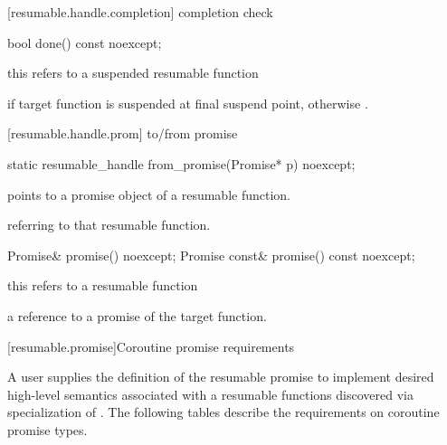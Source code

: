 [resumable.handle.completion]{ completion check}
\begin{itemdecl}
  bool done() const noexcept; 
\end{itemdecl}
\begin{itemdescr}
  \pnum
  \precondition *this refers to a suspended resumable function
  
  \pnum
  \returns {} if target function is suspended
  at final suspend point, otherwise .
\end{itemdescr}

[resumable.handle.prom]{ to/from promise}
\begin{itemdecl}
  static resumable_handle from_promise(Promise* p) noexcept;	
\end{itemdecl}
\begin{itemdescr}
  \pnum
  \precondition {} points to a promise object of a resumable function.
  
  \pnum
  \returns {} referring to that resumable function.
\end{itemdescr}
\begin{itemdecl}
  Promise& promise() noexcept;		
  Promise const& promise() const noexcept;
\end{itemdecl}

\begin{itemdescr}
  \pnum
  \precondition *this refers to a resumable function
  
  \pnum
  \returns a reference to a promise of the target function.
\end{itemdescr}


[resumable.promise]{Coroutine promise requirements}

\pnum
A user supplies the definition of the resumable promise to implement 
desired high-level semantics associated with a resumable functions
discovered via specialization of .
The following tables describe the requirements on
coroutine promise types.


